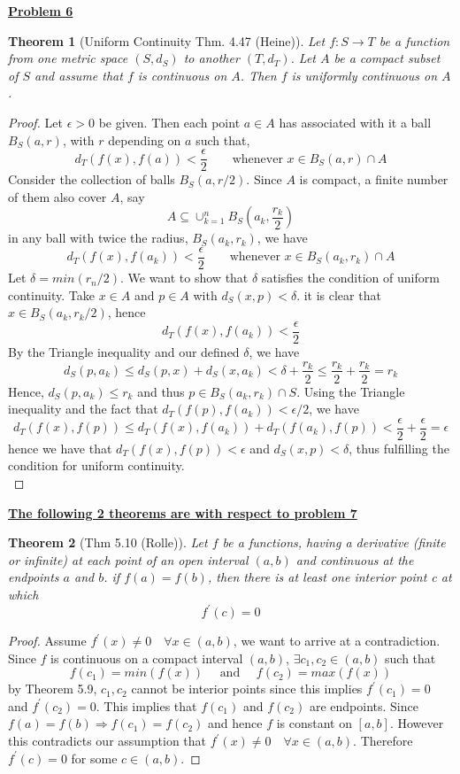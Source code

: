 \documentclass[aps,pra,notitlepage,amsmath,amssymb,letterpaper,12pt]{revtex4-1}
\newtheorem{theorem}{Theorem}
\begin{document}
\underline{\textbf{Problem 6}}
\begin{theorem}[Uniform Continuity Thm. 4.47 (Heine)]
Let $f:S \to T$ be a function from one metric space $(S,d_{S})$ to another $(T,d_{T})$. Let $A$ be a compact subset of $S$ and assume that $f$ is continuous on $A$. Then $f$ is uniformly continuous on $A$.
\end{theorem}
\begin{proof}
Let $\epsilon > 0$ be given. Then each point $a \in A$ has associated with it a ball  $B_{S}(a,r)$, with $r$ depending on $a$ such that,
$$d_{T}(f(x),f(a)) < \frac{\epsilon}{2} \qquad \textrm{whenever } x\in B_{S}(a,r)\cap A$$
Consider the collection of balls $B_{S}(a,r/2)$. Since $A$ is compact, a finite number of them also cover $A$, say
$$ A \subseteq \cup_{k=1}^{n} B_{S}(a_{k},\frac{r_{k}}{2})  $$
in any ball with twice the radius, $B_{S}(a_{k},r_{k})$, we have
$$d_{T}(f(x),f(a_{k})) < \frac{\epsilon}{2} \qquad \textrm{whenever } x\in B_{S}(a_{k},r_{k}) \cap A$$
Let $\delta = min(r_{n}/2)$. We want to show that $\delta$ satisfies the condition of uniform continuity. Take $x \in A$ and $p \in A$ with $d_{S}(x,p) < \delta$. it is clear that $x \in B_{S}(a_{k},r_{k}/2)$, hence
$$ d_{T}(f(x),f(a_{k})) < \frac{\epsilon}{2} $$
By the Triangle inequality and our defined $\delta$, we have
$$d_{S}(p,a_{k}) \leq d_{S}(p,x) + d_{S}(x,a_{k}) < \delta + \frac{r_{k}}{2} \leq \frac{r_{k}}{2} + \frac{r_{k}}{2} = r_{k}$$
Hence, $d_{S}(p,a_{k}) \leq r_{k}$ and thus $p \in B_{S}(a_{k},r_{k}) \cap S$. Using the Triangle inequality and the fact that $d_{T}(f(p),f(a_{k})) < \epsilon /2$, we have
$$d_{T}(f(x),f(p)) \leq d_{T}(f(x),f(a_{k})) + d_{T}(f(a_{k}), f(p)) < \frac{\epsilon}{2} + \frac{\epsilon}{2} = \epsilon$$
hence we have that $d_{T}(f(x),f(p)) < \epsilon$ and $d_{S}(x,p) < \delta$, thus fulfilling the condition for uniform continuity.
$$ $$
$$ $$
\end{proof}

\underline{\textbf{The following 2 theorems are with respect to problem 7}}
\begin{theorem}[Thm 5.10 (Rolle)]
Let $f$ be a functions, having a derivative (finite or infinite) at each point
of an open interval $(a,b)$ and continuous at the endpoints $a$ and $b$. if $f(a)=f(b)$, then there is at least one interior point c at which
\[f^\prime(c) = 0\]
\end{theorem}
\begin{proof}
Assume $f^\prime(x) \neq 0 \quad \forall x \in (a,b)$, we want to arrive at a contradiction. Since $f$ is continuous on a compact interval $(a,b)$, $\exists c_{1},c_{2} \in (a,b)$ such that $$f(c_{1}) = min(f(x)) \quad \textrm{ and } \quad f(c_{2}) = max(f(x))$$
by Theorem 5.9, $c_{1}, c_{2}$ cannot be interior points since this implies $f^\prime(c_{1}) = 0$ and $f^\prime(c_{2}) = 0$. This implies that $f(c_{1})$ and $f(c_{2})$ are endpoints. Since $f(a) = f(b) \Rightarrow f(c_{1}) = f(c_{2})$ and hence $f$ is constant on $[a,b]$. However this contradicts our assumption that $f^\prime(x) \neq 0 \quad \forall x \in (a,b)$. Therefore $f^\prime(c) = 0$ for some $c \in (a,b)$.\newline{}
\end{proof}
\end{document}
